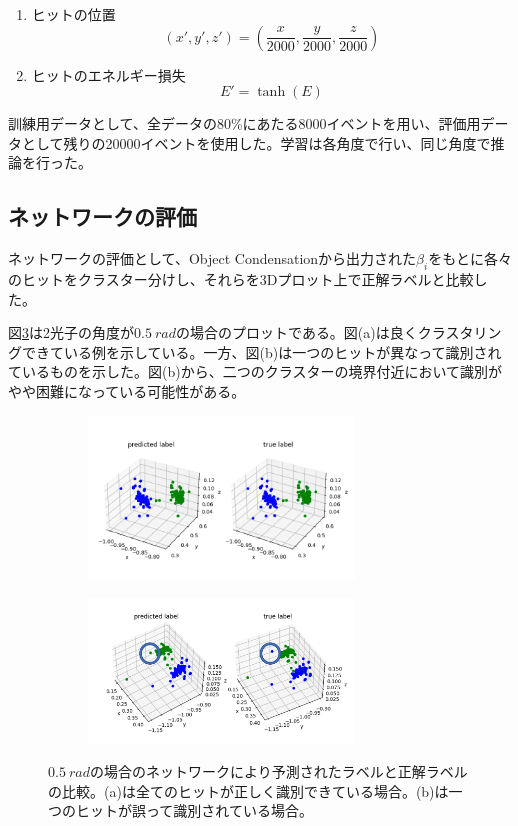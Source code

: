 \begin{enumerate}
\item ヒットの位置
\[
(x',y',z') = \left(\frac{x}{2000},\frac{y}{2000},\frac{z}{2000}\right) 
\]
\item ヒットのエネルギー損失
\[
E' = \tanh(E)
\]
\end{enumerate}
訓練用データとして、全データの80\%にあたる8000イベントを用い、評価用データとして残りの20000イベントを使用した。学習は各角度で行い、同じ角度で推論を行った。

\subsection{ネットワークの評価}
ネットワークの評価として、Object Condensationから出力された$\beta_i$をもとに各々のヒットをクラスター分けし、それらを3Dプロット上で正解ラベルと比較した。

図\ref{DoublePG_5_res}は2光子の角度が$\SI{0.5}{rad}$の場合のプロットである。図(a)は良くクラスタリングできている例を示している。一方、図(b)は一つのヒットが異なって識別されているものを示した。図(b)から、二つのクラスターの境界付近において識別がやや困難になっている可能性がある。


\begin{figure}[H]
	\begin{subfigure}{.5\textwidth}
		\begin{center}
 		 	\includegraphics[width=200pt]{./Figure/DLAnalysis/Double5_1.png}%
  			\caption{}
  			\label{DPG_res_a}
 		\end{center}
	\end{subfigure}
	\begin{subfigure}{.5\textwidth}
		\begin{center}
			\includegraphics[width=200pt]{./Figure/DLAnalysis/Double5_2.png}%
			\caption{}
			\label{DPG_res_b}
		\end{center}
	\end{subfigure}
	\caption[$\SI{0.5}{rad}$の場合の比較]{$\SI{0.5}{rad}$の場合のネットワークにより予測されたラベルと正解ラベルの比較。(a)は全てのヒットが正しく識別できている場合。(b)は一つのヒットが誤って識別されている場合。}
	\label{DoublePG_5_res}
\end{figure}

